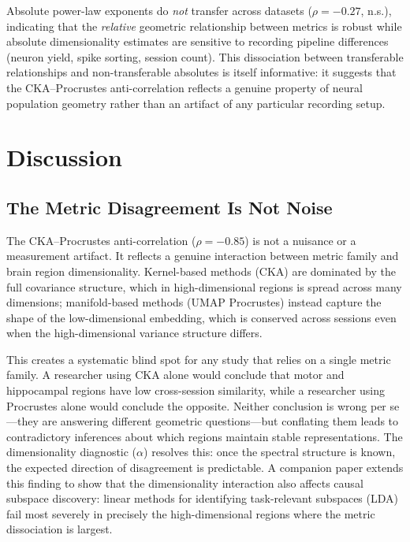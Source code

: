 \documentclass{article}
\begin{document}
Absolute power-law exponents do \emph{not} transfer across datasets ($\rho = -0.27$, n.s.), indicating that the \emph{relative} geometric relationship between metrics is robust while absolute dimensionality estimates are sensitive to recording pipeline differences (neuron yield, spike sorting, session count). This dissociation between transferable relationships and non-transferable absolutes is itself informative: it suggests that the CKA--Procrustes anti-correlation reflects a genuine property of neural population geometry rather than an artifact of any particular recording setup.

\section{Discussion}

\subsection{The Metric Disagreement Is Not Noise}

The CKA--Procrustes anti-correlation ($\rho = -0.85$) is not a nuisance or a measurement artifact. It reflects a genuine interaction between metric family and brain region dimensionality. Kernel-based methods (CKA) are dominated by the full covariance structure, which in high-dimensional regions is spread across many dimensions; manifold-based methods (UMAP Procrustes) instead capture the shape of the low-dimensional embedding, which is conserved across sessions even when the high-dimensional variance structure differs.

This creates a systematic blind spot for any study that relies on a single metric family. A researcher using CKA alone would conclude that motor and hippocampal regions have low cross-session similarity, while a researcher using Procrustes alone would conclude the opposite. Neither conclusion is wrong per se---they are answering different geometric questions---but conflating them leads to contradictory inferences about which regions maintain stable representations. The dimensionality diagnostic ($\alpha$) resolves this: once the spectral structure is known, the expected direction of disagreement is predictable. A companion paper extends this finding to show that the dimensionality interaction also affects causal subspace discovery: linear methods for identifying task-relevant subspaces (LDA) fail most severely in precisely the high-dimensional regions where the metric dissociation is largest.
\end{document}
